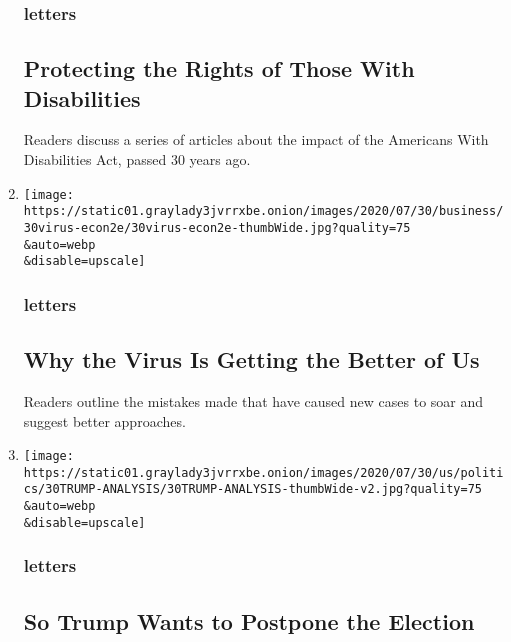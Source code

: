 \begin{enumerate}
  \hypertarget{letters-2}{%
  \subsubsection{letters}\label{letters-2}}

  \hypertarget{protecting-the-rights-of-those-with-disabilities}{%
  \subsection{Protecting the Rights of Those With
  Disabilities}\label{protecting-the-rights-of-those-with-disabilities}}

  Readers discuss a series of articles about the impact of the Americans
  With Disabilities Act, passed 30 years ago.
\item
  \href{/2020/07/31/opinion/letters/coronavirus-economy.html}{}

  \texttt{[image: https://static01.graylady3jvrrxbe.onion/images/2020/07/30/business/30virus-econ2e/30virus-econ2e-thumbWide.jpg?quality=75\\\&auto=webp\\\&disable=upscale]}

  \hypertarget{letters-3}{%
  \subsubsection{letters}\label{letters-3}}

  \hypertarget{why-the-virus-is-getting-the-better-of-us}{%
  \subsection{Why the Virus Is Getting the Better of
  Us}\label{why-the-virus-is-getting-the-better-of-us}}

  Readers outline the mistakes made that have caused new cases to soar
  and suggest better approaches.
\item
  \href{/2020/07/31/opinion/letters/trump-election.html}{}

  \texttt{[image: https://static01.graylady3jvrrxbe.onion/images/2020/07/30/us/politics/30TRUMP-ANALYSIS/30TRUMP-ANALYSIS-thumbWide-v2.jpg?quality=75\\\&auto=webp\\\&disable=upscale]}

  \hypertarget{letters-4}{%
  \subsubsection{letters}\label{letters-4}}

  \hypertarget{so-trump-wants-to-postpone-the-election}{%
  \subsection{So Trump Wants to Postpone the
  Election}\label{so-trump-wants-to-postpone-the-election}}


\end{enumerate}
